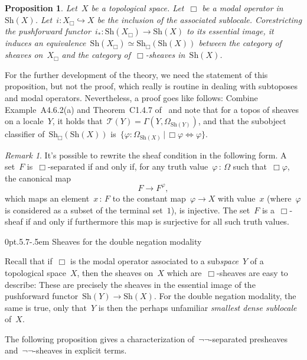 \documentclass[10pt,reqno,a4paper]{amsbook}
\makeatletter
\theoremstyle{definition}
\theoremstyle{plain}
\newtheorem{prop}[defn]{Proposition}
\theoremstyle{remark}
\newtheorem{rem}[defn]{Remark}
\newcommand{\T}{\mathcal{T}}
\newcommand{\Sh}{\mathrm{Sh}}
\newcommand{\Open}{\T}
\newcommand{\?}{\,{:}\,}
\renewcommand{\_}{\mathpunct{.}\,}
\newcommand{\lra}{\longrightarrow}
\renewenvironment{proof}[1][\proofname]{\par
  \pushQED{\qed}%
  \normalfont \topsep6\p@\@plus6\p@\relax
  \trivlist
  \item[\hskip\labelsep
        \itshape
    #1\@addpunct{.}]\ignorespaces
}{%
  \popQED\endtrivlist\@endpefalse
}
\def\subsection{\@startsection{subsection}{2}%
  {0pt}{.5\linespacing\@plus.7\linespacing}{-.5em}%
  {\normalfont\bfseries}}
\makeatother
\begin{document}
\begin{prop}Let~$X$ be a topological space. Let~$\Box$ be a modal operator
in~$\Sh(X)$. Let~$i : X_\Box \hookrightarrow X$ be the inclusion of the
associated sublocale. Corestricting the pushforward functor~$i_* : \Sh(X_\Box) \to
\Sh(X)$ to its essential image, it induces an equivalence~$\Sh(X_\Box) \simeq
\Sh_\Box(\Sh(X))$ between the category of sheaves on~$X_\Box$ and the category
of~$\Box$-sheaves in~$\Sh(X)$.
\end{prop}
\begin{proof}For the further development of the theory, we need the statement
of this proposition, but not the proof, which really is routine in dealing with
subtoposes and modal operators. Nevertheless, a proof goes like follows:
Combine Example~A4.6.2(a) and Theorem~C1.4.7
of~\cite{johnstone:elephant} and note that for a topos of sheaves on a
locale~$Y$, it holds that~$\Open(Y) = \Gamma(Y, \Omega_{\Sh(Y)})$, and that the
subobject classifier of~$\Sh_\Box(\Sh(X))$ is~$\{ \varphi : \Omega_{\Sh(X)} \,|\,
\Box \varphi \Leftrightarrow \varphi \}$.
\end{proof}

\begin{rem}It's possible to rewrite the sheaf condition in the following form.
A set~$F$ is~$\Box$-separated if and only if, for any truth value~$\varphi \?
\Omega$ such that~$\Box\varphi$, the canonical map
\[ F \lra F^\varphi, \]
which maps an element~$x\?F$ to the constant map~$\varphi \to X$ with value~$x$
(where~$\varphi$ is considered as a subset of the terminal set~$1$), is
injective. The set~$F$ is a~$\Box$-sheaf if and only if furthermore this map is
surjective for all such truth values.
\end{rem}


\subsection{Sheaves for the double negation modality}
\label{sect:negneg-sheaves}

Recall that if~$\Box$ is the modal operator associated to a sub\emph{space}~$Y$
of a topological space~$X$, then the sheaves on~$X$ which are~$\Box$-sheaves
are easy to describe: These are precisely the sheaves in the essential image of
the pushforward functor~$\Sh(Y) \to \Sh(X)$. For the double negation modality,
the same is true, only that~$Y$ is then the perhaps unfamiliar \emph{smallest
dense sublocale} of~$X$.

The following proposition gives a characterization of~$\neg\neg$-separated
presheaves and~$\neg\neg$-sheaves in explicit terms.
\end{document}
